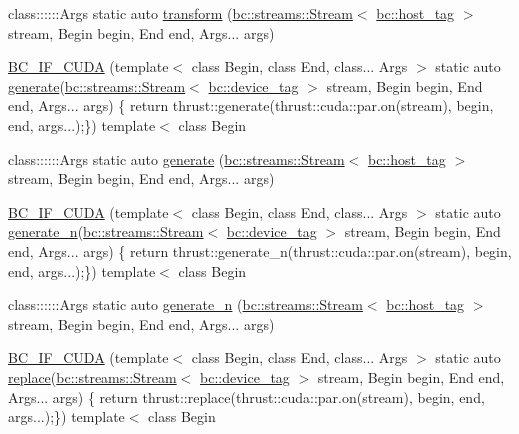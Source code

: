 \begin{DoxyCompactItemize}
\item 
class\+::::::\+Args static auto \hyperlink{namespacebc_1_1algorithms_a56a3d18b6c2d6ece7a0b06c2583032d2}{transform} (\hyperlink{classbc_1_1streams_1_1Stream}{bc\+::streams\+::\+Stream}$<$ \hyperlink{structbc_1_1host__tag}{bc\+::host\+\_\+tag} $>$ stream, Begin begin, End end, Args... args)
\item 
\hyperlink{namespacebc_1_1algorithms_a00fdd407b1bd98ee4fcf0deb88eeb2f9}{B\+C\+\_\+\+I\+F\+\_\+\+C\+U\+DA} (template$<$ class Begin, class End, class... Args $>$ static auto \hyperlink{namespacebc_1_1algorithms_a9377b5d8710a009d9746680a1d3e7016}{generate}(\hyperlink{classbc_1_1streams_1_1Stream}{bc\+::streams\+::\+Stream}$<$ \hyperlink{structbc_1_1device__tag}{bc\+::device\+\_\+tag} $>$ stream, Begin begin, End end, Args... args) \{ return thrust\+::generate(thrust\+::cuda\+::par.\+on(stream), begin, end, args...);\}) template$<$ class Begin
\item 
class\+::::::\+Args static auto \hyperlink{namespacebc_1_1algorithms_a9377b5d8710a009d9746680a1d3e7016}{generate} (\hyperlink{classbc_1_1streams_1_1Stream}{bc\+::streams\+::\+Stream}$<$ \hyperlink{structbc_1_1host__tag}{bc\+::host\+\_\+tag} $>$ stream, Begin begin, End end, Args... args)
\item 
\hyperlink{namespacebc_1_1algorithms_a0ead3fbb16c6bd61241ddc8b9cd3082d}{B\+C\+\_\+\+I\+F\+\_\+\+C\+U\+DA} (template$<$ class Begin, class End, class... Args $>$ static auto \hyperlink{namespacebc_1_1algorithms_a327b4d58fa795cac167a69a3450791a5}{generate\+\_\+n}(\hyperlink{classbc_1_1streams_1_1Stream}{bc\+::streams\+::\+Stream}$<$ \hyperlink{structbc_1_1device__tag}{bc\+::device\+\_\+tag} $>$ stream, Begin begin, End end, Args... args) \{ return thrust\+::generate\+\_\+n(thrust\+::cuda\+::par.\+on(stream), begin, end, args...);\}) template$<$ class Begin
\item 
class\+::::::\+Args static auto \hyperlink{namespacebc_1_1algorithms_a327b4d58fa795cac167a69a3450791a5}{generate\+\_\+n} (\hyperlink{classbc_1_1streams_1_1Stream}{bc\+::streams\+::\+Stream}$<$ \hyperlink{structbc_1_1host__tag}{bc\+::host\+\_\+tag} $>$ stream, Begin begin, End end, Args... args)
\item 
\hyperlink{namespacebc_1_1algorithms_ae0682a09ecb1a1c4b35f51b8ec5fb122}{B\+C\+\_\+\+I\+F\+\_\+\+C\+U\+DA} (template$<$ class Begin, class End, class... Args $>$ static auto \hyperlink{namespacebc_1_1algorithms_ac61f6fc5e5556baadc24249bc26d789f}{replace}(\hyperlink{classbc_1_1streams_1_1Stream}{bc\+::streams\+::\+Stream}$<$ \hyperlink{structbc_1_1device__tag}{bc\+::device\+\_\+tag} $>$ stream, Begin begin, End end, Args... args) \{ return thrust\+::replace(thrust\+::cuda\+::par.\+on(stream), begin, end, args...);\}) template$<$ class Begin

\end{DoxyCompactItemize}

